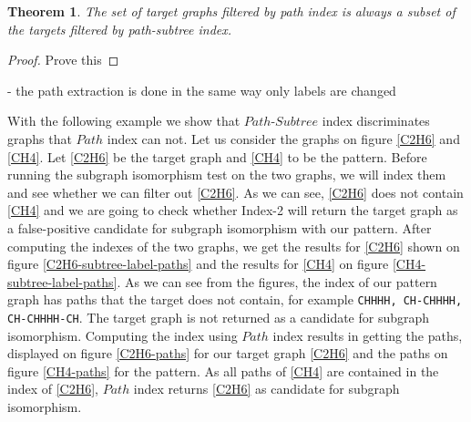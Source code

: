 \documentclass{l4proj}
\newcounter{example}[section]
\newtheorem{theorem}{Theorem}[section]
\begin{document}
\begin{theorem}
The set of target graphs filtered by path index is always a subset of the targets filtered by path-subtree index.
\end{theorem}

\begin{proof}
Prove this

\end{proof}


- the path extraction is done in the same way only labels are changed


With the following example we show that $Path$-$Subtree$ index discriminates graphs that $Path$ index can not. Let us consider the graphs on figure \ref{C2H6} and \ref{CH4}. Let \ref{C2H6} be the target graph and \ref{CH4} to be the pattern. Before running the subgraph isomorphism test on the two graphs, we will index them and see whether we can filter out \ref{C2H6}. As we can see, \ref{C2H6} does not contain \ref{CH4} and we are going to check whether Index-2 will return the target graph as a false-positive candidate for subgraph isomorphism with our pattern. After computing the indexes of the two graphs, we get the results for \ref{C2H6} shown on figure \ref{C2H6-subtree-label-paths} and the results for \ref{CH4} on figure \ref{CH4-subtree-label-paths}. As we can see from the figures, the index of our pattern graph has paths that the target does not contain, for example \texttt{CHHHH, CH-CHHHH, CH-CHHHH-CH}. The target graph is not returned as a candidate for subgraph isomorphism. Computing the index using $Path$ index results in getting the paths, displayed on figure \ref{C2H6-paths} for our target graph \ref{C2H6} and the paths on figure \ref{CH4-paths} for the pattern. As all paths of \ref{CH4} are contained in the index of \ref{C2H6}, $Path$ index returns \ref{C2H6} as candidate for subgraph isomorphism.\par
\end{document}
